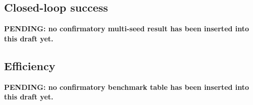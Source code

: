 \subsection{Closed-loop success}
\textbf{PENDING: no confirmatory multi-seed result has been inserted into this draft yet.}

\subsection{Efficiency}
\textbf{PENDING: no confirmatory benchmark table has been inserted into this draft yet.}
